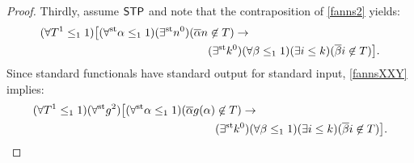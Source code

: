 \documentclass[reqno]{amsart}
\newtheorem{thm}{Theorem}
\def\STP{\textup{\textsf{STP}}}
\def\P{\textup{\textsf{P}}}
\def\st{\textup{st}}
\def\asa{\leftrightarrow}
\def\di{\rightarrow}
\def\HAC{\textup{\textsf{HAC}}}
\def\INT{\textup{\textsf{int}}}
\numberwithin{equation}{section}
\numberwithin{thm}{section}
\begin{document}
\begin{proof}
Thirdly, assume $\STP$ and note that the contraposition of \eqref{fanns2} yields:
\begin{align}\label{fannsXXY}
(\forall T^{1}\leq_{1}1)\big[ (\forall^{\st}\alpha\leq_{1}1)(\exists^{\st}n^{0})(\overline{\alpha}n&\not\in T)\di\\
 &(\exists^{\st}k^{0})(\forall \beta\leq_{1}1)(\exists i\leq k)(\overline{\beta}i\not\in T) \big].\notag
\end{align}
Since standard functionals have standard output for standard input, \eqref{fannsXXY} implies:
\begin{align}\label{fannsXXX}
(\forall T^{1}\leq_{1}1)(\forall^{\st}g^{2})\big[ (\forall^{\st}\alpha\leq_{1}1)(\overline{\alpha}g(\alpha)&\not\in T)\di\\
 &(\exists^{\st}k^{0})(\forall \beta\leq_{1}1)(\exists i\leq k)(\overline{\beta}i\not\in T) \big].\notag

\end{align}
\end{proof}
\end{document}
